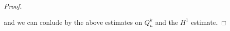 \documentclass[english,a4paper,10pt,oneside]{scrbook}	%
\theoremstyle{break}
\newenvironment{mproof}[1][\proofname]{%
  \begin{proof}[#1]$ $\par\nobreak\ignorespaces
}{%
  \end{proof}
}
\renewcommand*{\proofname}{Proof}
\theoremstyle{remark}
\newcommand{\norm}[1]{\left\lVert#1\right\rVert}
\begin{document}
\begin{appendices}
\begin{mproof}
%
%
%
%

and we can conlude by the above estimates on $Q_h^k$ and the $H^1$ estimate.
\end{mproof}


\end{appendices}
\end{document}

